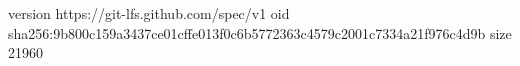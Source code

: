 version https://git-lfs.github.com/spec/v1
oid sha256:9b800c159a3437ce01cffe013f0c6b5772363c4579c2001c7334a21f976c4d9b
size 21960

